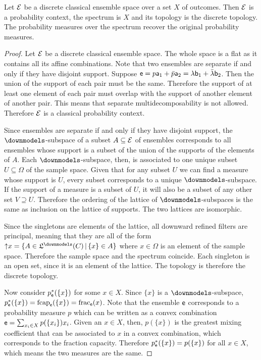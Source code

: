 \begin{mathSection}
	\begin{prop}
		Let $\Ens$ be a discrete classical ensemble space over a set $X$ of outcomes. Then $\Ens$ is a probability context, the spectrum is $X$ and its topology is the discrete topology. The probability measures over the spectrum recover the original probability measures.
	\end{prop}
	
	\begin{proof}
		Let $\Ens$ be a discrete classical ensemble space. The whole space is a flat as it contains all its affine combinations. Note that two ensembles are separate if and only if they have disjoint support. Suppose $\ens = p \ens[a]_1 + \bar{p} \ens[a]_2 = \lambda \ens[b]_1 + \bar{\lambda} \ens[b]_2$. Then the union of the support of each pair must be the same. Therefore the support of at least one element of each pair must overlap with the support of another element of another pair. This means that separate multidecomposability is not allowed. Therefore $\Ens$ is a classical probability context.
		
		Since ensembles are separate if and only if they have disjoint support, the $\separate$-subspace of a subset $A \subseteq \Ens$ of ensembles corresponds to all ensembles whose support is a subset of the union of the supports of the elements of $A$. Each $\separate$-subspace, then, is associated to one unique subset $U \subseteq \Omega$ of the sample space. Given that for any subset $U$ we can find a measure whose support is $U$, every subset corresponds to a unique $\separate$-subspace. If the support of a measure is a subset of $U$, it will also be a subset of any other set $V \supseteq U$. Therefore the ordering of the lattice of $\separate$-subspaces is the same as inclusion on the lattice of supports. The two lattices are isomorphic.
		
		Since the singletons are elements of the lattice, all downward refined filters are principal, meaning that they are all of the form $\uparrow\mathclose{x} = \{A \in \mathfrak{L}^\separate(C) \, | \, \{x\} \in A\}$ where $x \in \Omega$ is an element of the sample space. Therefore the sample space and the spectrum coincide. Each singleton is an open set, since it is an element of the lattice. The topology is therefore the discrete topology.
		
		Now consider $p^*_{\ens}(\{x\})$ for some $x \in X$. Since $\{x\}$ is a $\separate$-subspace, $p^*_{\ens}(\{x\}) = \fcap_{\ens}(\{x\}) = \fraction_{\ens}(x)$. Note that the ensemble $\ens$ corresponds to a probability measure $p$ which can be written as a convex combination $\ens = \sum_{x_i \in X} p(\{x_i\}) x_i$. Given an $x \in X$, then, $p(\{x\})$ is the greatest mixing coefficient that can be associated to $x$ in a convex combination, which corresponds to the fraction capacity. Therefore $p^*_{\ens}(\{x\}) = p(\{x\})$ for all $x \in X$, which means the two measures are the same.
	\end{proof}
\end{mathSection}

